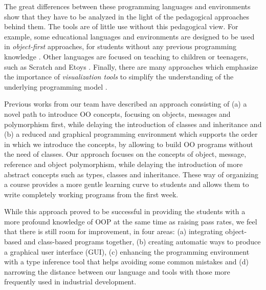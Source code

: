 The great differences between these programming languages and environments show that they have to be analyzed in the light of the pedagogical approaches behind them.
The tools are of little use without this pedagogical view.
For example, some educational languages and environments are designed to be used in \textit{object-first} approaches, 
\ie for students without any previous programming knowledge \cite{arnow_introduction_1998, bruce_library_2001}.
Other languages are focused on teaching to children or teenagers, such as Scratch \cite{malan_scratch_2007} and Etoys \cite{lee_empowering_2011}. 
Finally, there are many approaches which emphasize the importance of \emph{visualization tools} 
to simplify the understanding of the underlying programming model \cite{cooper_teaching_2003, roberts_designing_1998}.

\medskip

Previous works from our team \cite{lombardi_instances_2007,lombardi_carlos_alumnos_2008,griggio_programming_2011,spigariol_lucas_ensenando_2013} have described an approach consisting of
(a) a novel path to introduce OO concepts, focusing on objects, messages and polymorphism first, while delaying the introduction of classes and inheritance and 
(b) a reduced and graphical programming environment which supports the order in which we introduce the concepts, by allowing to build OO programs without the need of classes.
Our approach focuses on the concepts of object, message, reference and object polymorphism, while delaying the introduction of more abstract concepts such as types, classes and inheritance.
These way of organizing a course provides a more gentle learning curve to students and allows them to write completely working programs from the first week.

While this approach proved to be successful in providing the students with a more profound knowledge of OOP at the same time as raising pass rates, 
we feel that there is still room for improvement, in four areas:
(a) integrating object-based and class-based programs together,
(b) creating automatic ways to produce a graphical user interface (GUI),
(c) enhancing the programming environment with a type inference tool \cite{Miln78a} that helps avoiding some common mistakes
and (d) narrowing the distance between our language and tools with those more frequently used in industrial development.

